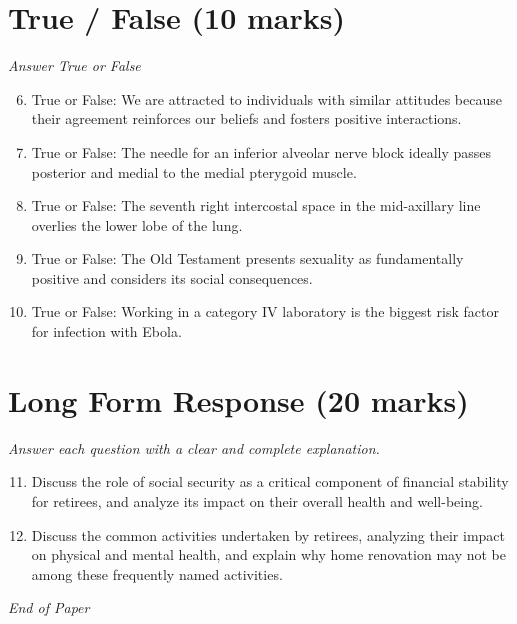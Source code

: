 \documentclass[12pt]{article}
\begin{document}
\section*{True / False (10 marks)}
\textit{Answer True or False}
\begin{enumerate}[label=\arabic*.]
\setcounter{enumi}{5}
\item True or False: We are attracted to individuals with similar attitudes because their agreement reinforces our beliefs and fosters positive interactions.
\item True or False: The needle for an inferior alveolar nerve block ideally passes posterior and medial to the medial pterygoid muscle.
\item True or False: The seventh right intercostal space in the mid-axillary line overlies the lower lobe of the lung.
\item True or False: The Old Testament presents sexuality as fundamentally positive and considers its social consequences.
\item True or False: Working in a category IV laboratory is the biggest risk factor for infection with Ebola.
\end{enumerate}

\section*{Long Form Response (20 marks)}
\textit{Answer each question with a clear and complete explanation.}
\begin{enumerate}[label=\arabic*.]
\setcounter{enumi}{10}
\item Discuss the role of social security as a critical component of financial stability for retirees, and analyze its impact on their overall health and well-being.
\item Discuss the common activities undertaken by retirees, analyzing their impact on physical and mental health, and explain why home renovation may not be among these frequently named activities.
\end{enumerate}

\vfill
\noindent\textit{End of Paper}
\end{document}
